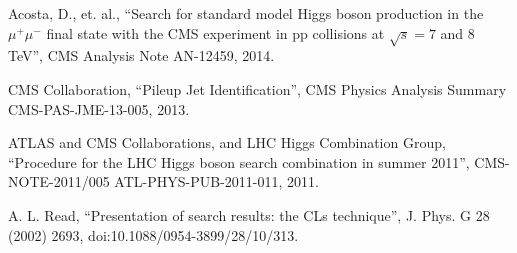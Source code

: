 \documentclass[12pt]{article}
\begin{document}
\begin{thebibliography}{9}

  Acosta, D., et. al.,
  ``Search for standard model Higgs boson production in the $\mu^+\mu^-$ final state with the CMS experiment in pp collisions at $\sqrt{s}=7$ and 8\, TeV'',
  CMS Analysis Note AN-12459,
  2014.

  CMS Collaboration, ``Pileup Jet Identification'', 
  CMS Physics Analysis Summary CMS-PAS-JME-13-005, 
  2013.

  ATLAS and CMS Collaborations, and LHC Higgs Combination Group, ``Procedure for
  the LHC Higgs boson search combination in summer 2011'', 
  CMS-NOTE-2011/005 ATL-PHYS-PUB-2011-011, 2011.

  A. L. Read, ``Presentation of search results: the CLs technique'', J. Phys. G 28 (2002) 2693,
  doi:10.1088/0954-3899/28/10/313.

\end{thebibliography}
 
\end{document}
